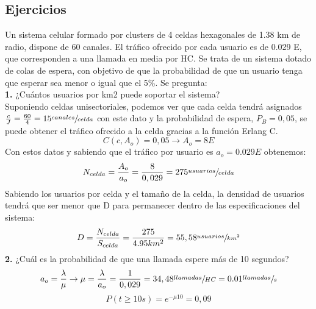 \subsection{Ejercicios}
\label{sub:ejercicios4}
\begin{exercise}[1]
	Un sistema celular formado por clusters de 4 celdas hexagonales de 1.38 km de radio, dispone de 60 canales. El tráfico ofrecido por cada usuario es de 0.029 E, que corresponden a una llamada en media por HC. Se trata de un sistema dotado de colas de espera, con objetivo de que la probabilidad de que un usuario tenga que esperar sea menor o igual que el 5\%. Se pregunta: \\
	\textbf{1.} ¿Cuántos usuarios por km2 puede soportar el sistema? \\
	Suponiendo celdas unisectoriales, podemos ver que cada celda tendrá asignados $\frac{c}{J}=\frac{60}{4}=15\sfrac{canales}{celda}$ con este dato y la probabilidad de espera, $P_B=0,05$, se puede obtener el tráfico ofrecido a la celda gracias a la función Erlang C. 
	\[C(c,A_o)=0,05\to A_o=8E\]
	Con estos datos y sabiendo que el tráfico por usuario es $a_o=0.029E$ obtenemos:
	\[N_{celda}=\frac{A_o}{a_o}=\frac{8}{0,029}=275\sfrac{usuarios}{celda}\]
	Sabiendo los usuarios por celda y el tamaño de la celda, la densidad de usuarios tendrá que ser menor que D para permanecer dentro de las especificaciones del sistema:
	\[D=\frac{N_{celda}}{S_{celda}}=\frac{275}{4.95km^2}=55,58\sfrac{usuarios}{km^2}\]
	\textbf{2.} ¿Cuál es la probabilidad de que una llamada espere más de 10 segundos?
	\[a_o=\frac{\lambda}{\mu}\to \mu=\frac{\lambda}{a_o}=\frac{1}{0,029}=34,48\sfrac{llamadas}{HC}=0.01\sfrac{llamadas}{s}\]
	\[P(t\geq 10s)=e^{-\mu 10}=0,09\]
\end{exercise}
